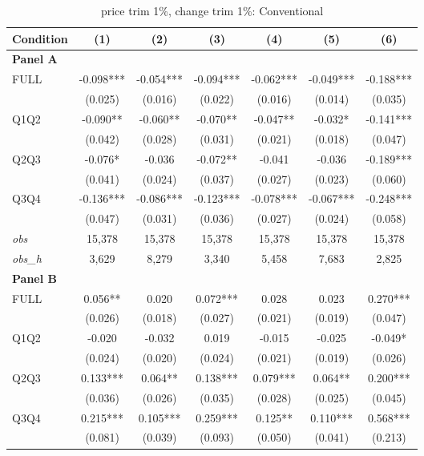 \begin{table}[!htbp]
\centering
\caption{price trim 1\%, change trim 1\%: Conventional}
\label{tab:abc:trim11:conventional}
\small
\begin{tabular}{lcccccc}
\toprule
Condition & (1) & (2) & (3) & (4) & (5) & (6) \\
\midrule
\textbf{Panel A} &&&&&&  \\

FULL & -0.098*** & -0.054*** & -0.094*** & -0.062*** & -0.049*** & -0.188*** \\
 & (0.025) & (0.016) & (0.022) & (0.016) & (0.014) & (0.035) \\
Q1Q2 & -0.090** & -0.060** & -0.070** & -0.047** & -0.032* & -0.141*** \\
 & (0.042) & (0.028) & (0.031) & (0.021) & (0.018) & (0.047) \\
Q2Q3 & -0.076* & -0.036 & -0.072** & -0.041 & -0.036 & -0.189*** \\
 & (0.041) & (0.024) & (0.037) & (0.027) & (0.023) & (0.060) \\
Q3Q4 & -0.136*** & -0.086*** & -0.123*** & -0.078*** & -0.067*** & -0.248*** \\
 & (0.047) & (0.031) & (0.036) & (0.027) & (0.024) & (0.058) \\

\textit{obs} & 15,378 & 15,378 & 15,378 & 15,378 & 15,378 & 15,378 \\
\textit{obs\_h} & 3,629 & 8,279 & 3,340 & 5,458 & 7,683 & 2,825 \\

\textbf{Panel B} &&&&&&  \\

FULL & 0.056** & 0.020 & 0.072*** & 0.028 & 0.023 & 0.270*** \\
 & (0.026) & (0.018) & (0.027) & (0.021) & (0.019) & (0.047) \\
Q1Q2 & -0.020 & -0.032 & 0.019 & -0.015 & -0.025 & -0.049* \\
 & (0.024) & (0.020) & (0.024) & (0.021) & (0.019) & (0.026) \\
Q2Q3 & 0.133*** & 0.064** & 0.138*** & 0.079*** & 0.064** & 0.200*** \\
 & (0.036) & (0.026) & (0.035) & (0.028) & (0.025) & (0.045) \\
Q3Q4 & 0.215*** & 0.105*** & 0.259*** & 0.125** & 0.110*** & 0.568*** \\
 & (0.081) & (0.039) & (0.093) & (0.050) & (0.041) & (0.213) \\


\end{tabular}
\end{table}
